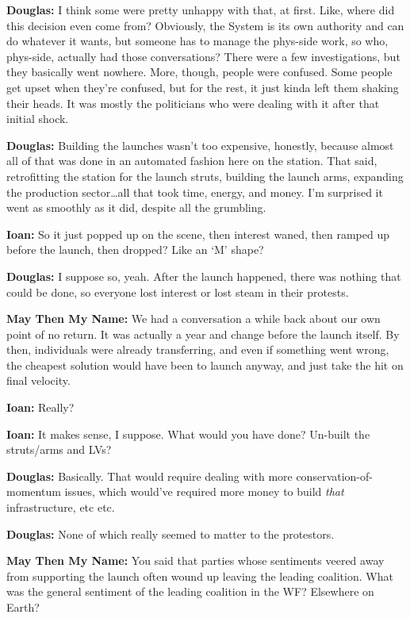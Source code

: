\textbf{Douglas:} I think some were pretty unhappy with that, at first. Like, where did this decision even come from? Obviously, the System is its own authority and can do whatever it wants, but someone has to manage the phys-side work, so who, phys-side, actually had those conversations? There were a few investigations, but they basically went nowhere. More, though, people were confused. Some people get upset when they're confused, but for the rest, it just kinda left them shaking their heads. It was mostly the politicians who were dealing with it after that initial shock.

\textbf{Douglas:} Building the launches wasn't too expensive, honestly, because almost all of that was done in an automated fashion here on the station. That said, retrofitting the station for the launch struts, building the launch arms, expanding the production sector\ldots all that took time, energy, and money. I'm surprised it went as smoothly as it did, despite all the grumbling.

\textbf{Ioan:} So it just popped up on the scene, then interest waned, then ramped up before the launch, then dropped? Like an `M' shape?

\textbf{Douglas:} I suppose so, yeah. After the launch happened, there was nothing that could be done, so everyone lost interest or lost steam in their protests.

\textbf{May Then My Name:} We had a conversation a while back about our own point of no return. It was actually a year and change before the launch itself. By then, individuals were already transferring, and even if something went wrong, the cheapest solution would have been to launch anyway, and just take the hit on final velocity.

\textbf{Ioan:} Really?

\textbf{Ioan:} It makes sense, I suppose. What would you have done? Un-built the struts/arms and LVs?

\textbf{Douglas:} Basically. That would require dealing with more conservation-of-momentum issues, which would've required more money to build \emph{that} infrastructure, etc etc.

\textbf{Douglas:} None of which really seemed to matter to the protestors.

\textbf{May Then My Name:} You said that parties whose sentiments veered away from supporting the launch often wound up leaving the leading coalition. What was the general sentiment of the leading coalition in the WF? Elsewhere on Earth?

